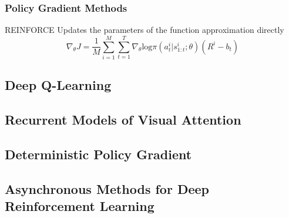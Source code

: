 \subsubsection{Policy Gradient Methods}
REINFORCE
Updates the parameters of the function approximation directly
\begin{equation*}
\nabla_\theta J = \frac{1}{M}\sum_{i=1}^M\sum_{t=1}^T\nabla_\theta  \text{log}\pi (a_t^i | s_{1:t}^i ; \theta)(R^i - b_t)
\label{eq:1}
\end{equation*}

\subsection{Deep Q-Learning}

\subsection{Recurrent Models of Visual Attention}

\subsection{Deterministic Policy Gradient} %

\subsection{Asynchronous Methods for Deep Reinforcement Learning}